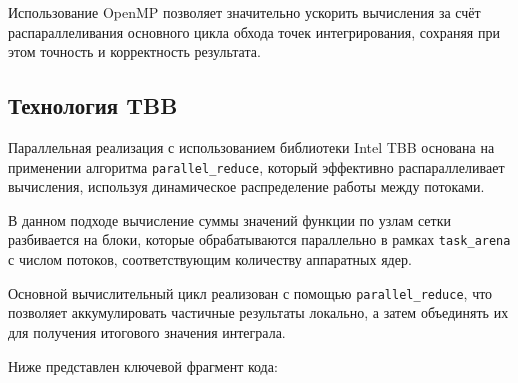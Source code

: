 \documentclass[a4paper,14pt]{article}
\begin{document}
Использование OpenMP позволяет значительно ускорить вычисления за счёт распараллеливания основного цикла обхода точек интегрирования, сохраняя при этом точность и корректность результата.

\subsection{Технология TBB}

Параллельная реализация с использованием библиотеки Intel TBB основана на применении алгоритма \texttt{parallel\_reduce}, который эффективно распараллеливает вычисления, используя динамическое распределение работы между потоками.

В данном подходе вычисление суммы значений функции по узлам сетки разбивается на блоки, которые обрабатываются параллельно в рамках \texttt{task\_arena} с числом потоков, соответствующим количеству аппаратных ядер.

Основной вычислительный цикл реализован с помощью \texttt{parallel\_reduce}, что позволяет аккумулировать частичные результаты локально, а затем объединять их для получения итогового значения интеграла.

Ниже представлен ключевой фрагмент кода:
\end{document}
